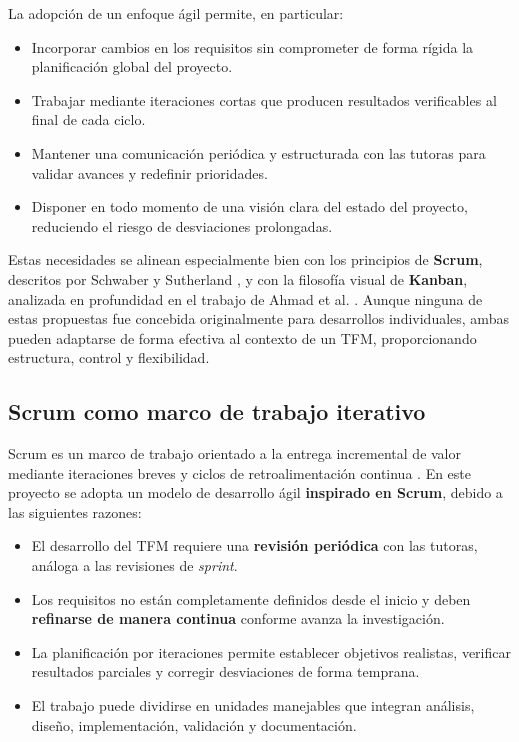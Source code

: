 \documentclass{report}
\begin{document}
La adopción de un enfoque ágil permite, en particular:

\begin{itemize}
    \item Incorporar cambios en los requisitos sin comprometer de forma rígida la planificación global del proyecto.  
    \item Trabajar mediante iteraciones cortas que producen resultados verificables al final de cada ciclo.  
    \item Mantener una comunicación periódica y estructurada con las tutoras para validar avances y redefinir prioridades.  
    \item Disponer en todo momento de una visión clara del estado del proyecto, reduciendo el riesgo de desviaciones prolongadas.  
\end{itemize}

Estas necesidades se alinean especialmente bien con los principios de \textbf{Scrum}, descritos por Schwaber y Sutherland \cite{schwaber2001agile}, y con la filosofía visual de \textbf{Kanban}, analizada en profundidad en el trabajo de Ahmad et al. \cite{ahmad2013kanban}. Aunque ninguna de estas propuestas fue concebida originalmente para desarrollos individuales, ambas pueden adaptarse de forma efectiva al contexto de un TFM, proporcionando estructura, control y flexibilidad.

\subsection{Scrum como marco de trabajo iterativo}

Scrum es un marco de trabajo orientado a la entrega incremental de valor mediante iteraciones breves y ciclos de retroalimentación continua \cite{schwaber2001agile}. En este proyecto se adopta un modelo de desarrollo ágil \textbf{inspirado en Scrum}, debido a las siguientes razones:

\begin{itemize}
    \item El desarrollo del TFM requiere una \textbf{revisión periódica} con las tutoras, análoga a las revisiones de \textit{sprint}.  
    \item Los requisitos no están completamente definidos desde el inicio y deben \textbf{refinarse de manera continua} conforme avanza la investigación.  
    \item La planificación por iteraciones permite establecer objetivos realistas, verificar resultados parciales y corregir desviaciones de forma temprana.  
    \item El trabajo puede dividirse en unidades manejables que integran análisis, diseño, implementación, validación y documentación.  
\end{itemize}
\end{document}
